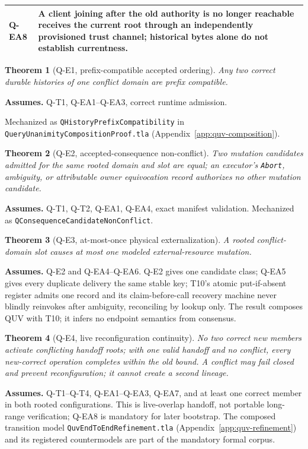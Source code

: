\documentclass[11pt]{article}
\newtheorem{theorem}{Theorem}
\newcommand{\code}[1]{\texttt{#1}}
\begin{document}
\begin{center}
\begin{tabularx}{\textwidth}{>{\raggedright\arraybackslash}p{} X}
\textbf{Q-EA8} & A client joining after the old authority is no longer reachable receives the current root through an independently provisioned trust channel; historical bytes alone do not establish currentness. \\
\bottomrule
\end{tabularx}
\end{center}

\begin{theorem}[Q-E1, prefix-compatible accepted ordering]
Any two correct durable histories of one conflict domain are prefix
compatible.
\end{theorem}
\noindent\textbf{Assumes.} Q-T1, Q-EA1--Q-EA3, correct runtime admission.
\par\noindent Mechanized as \code{QHistoryPrefixCompatibility} in
\code{QueryUnanimityCompositionProof.tla}
(Appendix~\ref{app:quv-composition}).

\begin{theorem}[Q-E2, accepted-consequence non-conflict]
Two mutation candidates admitted for the same rooted domain and slot are
equal; an executor's \code{Abort}, ambiguity, or attributable owner
equivocation record authorizes no other mutation candidate.
\end{theorem}
\noindent\textbf{Assumes.} Q-T1, Q-T2, Q-EA1, Q-EA4, exact manifest
validation. Mechanized as \code{QConsequenceCandidateNonConflict}.

\begin{theorem}[Q-E3, at-most-once physical externalization]
A rooted conflict-domain slot causes at most one modeled external-resource
mutation.
\end{theorem}
\noindent\textbf{Assumes.} Q-E2 and Q-EA4--Q-EA6. Q-E2 gives one candidate
class; Q-EA5 gives every duplicate delivery the same stable key; T10's atomic
put-if-absent register admits one record and its claim-before-call recovery
machine never blindly reinvokes after ambiguity, reconciling by lookup only.
The result composes QUV with T10; it infers no endpoint semantics from
consensus.

\begin{theorem}[Q-E4, live reconfiguration continuity]
No two correct new members activate conflicting handoff roots; with one valid
handoff and no conflict, every new-correct operation completes within the old
bound. A conflict may fail closed and prevent reconfiguration; it cannot
create a second lineage.
\end{theorem}
\noindent\textbf{Assumes.} Q-T1--Q-T4, Q-EA1--Q-EA3, Q-EA7, and at least one
correct member in both rooted configurations. This is live-overlap handoff,
not portable long-range verification; Q-EA8 is mandatory for later bootstrap.
The composed transition model \code{QuvEndToEndRefinement.tla}
(Appendix~\ref{app:quv-refinement}) and its registered countermodels are part
of the mandatory formal corpus.
\end{document}
